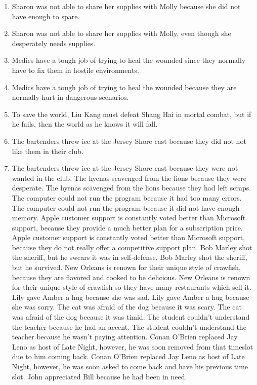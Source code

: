\documentclass{article}
\begin{document}
\begin{enumerate}
	\item Sharon was not able to share her supplies with Molly because she did not have enough to spare.
	\item Sharon was not able to share her supplies with Molly, even though she desperately needs supplies.
	\item Medics have a tough job of trying to heal the wounded since they normally have to fix them in hostile environments.
	\item Medics have a tough job of trying to heal the wounded because they are normally hurt in dangerous scenarios.
	\item To save the world, Liu Kang must defeat Shang Hai in mortal combat, but if he fails, then the world as he knows it will fall.
	\item The bartenders threw ice at the Jersey Shore cast because they did not not like them in their club.
	\item The bartenders threw ice at the Jersey Shore cast because they were not wanted in the club.
	The hyenas scavenged from the lions because they were desperate.
	The hyenas scavenged from the lions because they had left scraps.
	The computer could not run the program because it had too many errors.
	The computer could not run the program because it did not have enough memory.
	Apple customer support is constantly voted better than Microsoft support, because they provide a much better plan for a subscription price.
	Apple customer support is constantly voted better than Microsoft support, because they do not really offer a competitive support plan.
	Bob Marley shot the sheriff, but he swears it was in self-defense.
	Bob Marley shot the sheriff, but he survived.
	New Orleans is renown for their unique style of crawfish, because they are flavored and cooked to be delicious.
	New Orleans is renown for their unique style of crawfish so they have many restaurants which sell it.
	Lily gave Amber a hug because she was sad.
	Lily gave Amber a hug because she was sorry.
	The cat was afraid of the dog because it was scary.
	The cat was afraid of the dog because it was timid.
	The student couldn't understand the teacher because he had an accent.
	The student couldn't understand the teacher because he wasn't paying attention.
	Conan O'Brien replaced Jay Leno as host of Late Night, however, he was soon removed from that timeslot due to him coming back.
	Conan O'Brien replaced Jay Leno as host of Late Night, however, he was soon asked to come back and have his previous time slot.
	John appreciated Bill because he had been in need.

\end{enumerate}
\end{document}
